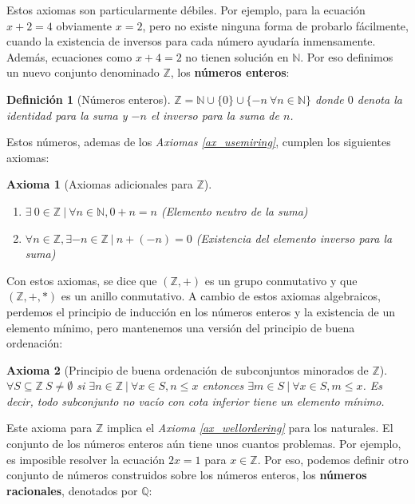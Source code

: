 \documentclass{article}
\newtheorem{axiom}{Axioma}
\newtheorem{define}{Definición}
\begin{document}
Estos axiomas son particularmente débiles. Por ejemplo, para la ecuación $x + 2 = 4$ obviamente $x = 2$, pero no existe ninguna forma de probarlo fácilmente, cuando la existencia de inversos para cada número ayudaría inmensamente. Además, ecuaciones como $x + 4 = 2$ no tienen solución en $\mathbb{N}$. Por eso definimos un nuevo conjunto denominado $\mathbb{Z}$, los \textbf{números enteros}:

\begin{define}[Números enteros]
$\mathbb{Z} = \mathbb{N} \cup \{0\} \cup \{-n\ \forall n \in \mathbb{N} \}$ donde $0$ denota la identidad para la suma y $-n$ el inverso para la suma de $n$. 
\end{define}

Estos números, ademas de los \textit{Axiomas \ref{ax_usemiring}}, cumplen los siguientes axiomas:

\begin{axiom}[Axiomas adicionales para $\mathbb{Z}$]\ 
\label{ax_additionalz}
\begin{enumerate}
	\item
	$\exists\ 0 \in \mathbb{Z}\ |\ \forall n \in \mathbb{N},0+n = n$ (Elemento neutro de la suma)
	\item
	$\forall n \in \mathbb{Z},\exists -n \in \mathbb{Z}\ |\ n+(-n)=0$ (Existencia del elemento inverso para la suma)
\end{enumerate}
\end{axiom}
Con estos axiomas, se dice que $(\mathbb{Z}, +)$ es un grupo conmutativo y que $(\mathbb{Z}, +, *)$ es un anillo conmutativo. A cambio de estos axiomas algebraicos, perdemos el principio de inducción en los números enteros y la existencia de un elemento mínimo, pero mantenemos una versión del principio de buena ordenación:

\begin{axiom}[Principio de buena ordenación de subconjuntos minorados de $\mathbb{Z}$]\ 
$\forall S \subseteq \mathbb{Z}\ S \neq \emptyset$ si $\exists n \in \mathbb{Z}\ |\ \forall x \in S,n\leq x$ entonces $\exists m \in S\ |\ \forall x \in S,m\leq x$. Es decir, todo subconjunto no vacío con cota inferior tiene un elemento mínimo.
\end{axiom}

Este axioma para $\mathbb{Z}$ implica el \textit{Axioma \ref{ax_wellordering}} para los naturales.
El conjunto de los números enteros aún tiene unos cuantos problemas. Por ejemplo, es imposible resolver la ecuación $2x=1$ para $x\in \mathbb{Z}$. Por eso, podemos definir otro conjunto de números construidos sobre los números enteros, los \textbf{números racionales}, denotados por $\mathbb{Q}$:
\end{document}
